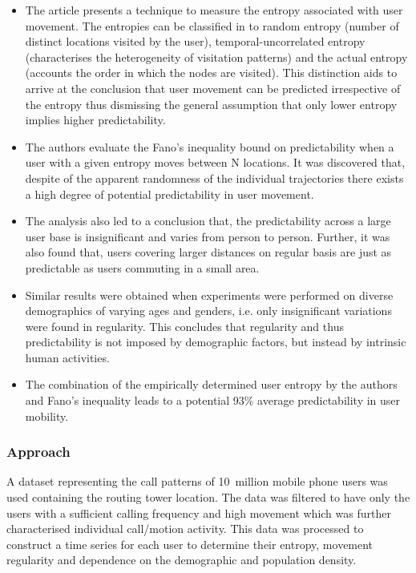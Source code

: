 \begin{itemize}

	\item The article presents a technique to measure the entropy associated with user movement. 
	The entropies can be classified in to random entropy (number of distinct locations visited by the user), 
	temporal-uncorrelated entropy (characterises the heterogeneity of visitation patterns) and the actual
	entropy (accounts the order in which the nodes are visited). This distinction aids to arrive at the 
	conclusion that user movement can be predicted irrespective of the entropy thus dismissing the 
	general assumption that only lower entropy implies higher predictability. 
		
	\item The authors evaluate the Fano's inequality bound on predictability when a user with a given entropy 
	moves between N locations. It was discovered that, despite of the apparent randomness of the individual
	trajectories there exists a high degree of potential predictability in user movement. 
	
	\item The analysis also led to a conclusion that, the predictability across a large user base is insignificant 
	and varies from person to person. Further, it was also found that, users covering larger distances on regular 
	basis are just as predictable as users commuting in a small area. 
	
	\item Similar results were obtained when experiments were performed on diverse demographics of varying ages and 
	genders, i.e. only insignificant variations were found in regularity. This concludes that regularity and thus 
	predictability is not imposed by demographic factors, but instead by intrinsic human activities. 
	
	\item The combination of the empirically determined user entropy by the authors and Fano's inequality leads 
	to a potential 93\% average predictability in user mobility. 
	
\end{itemize}

\subsubsection*{Approach}

A dataset representing the call patterns of 10~million mobile phone users was used containing the routing tower 
location. The data was filtered to have only the users with a sufficient calling frequency and high 
movement which was further characterised individual call/motion activity. This data was processed to construct 
a time series for each user to determine their entropy, movement regularity and dependence on the demographic
and population density. 
 
